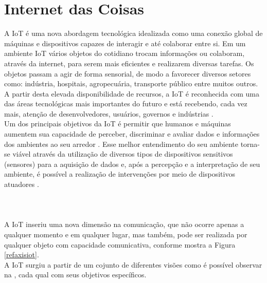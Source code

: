 \section{Internet das Coisas}%
\label{sec:internetofthings}
\quad
A \acrlong{IoT} é uma nova abordagem tecnológica idealizada como uma conexão global
de máquinas e dispositivos capazes de interagir e até colaborar entre si. Em um ambiente \acrshort{IoT} vários objetos do cotidiano trocam informações
ou colaboram, através da internet, para serem mais eficientes e realizarem diversas tarefas.
Os objetos passam a agir de forma sensorial, de modo a favorecer diversos setores como:
indústria, hospitais, agropecuária, transporte público entre muitos outros. A partir desta
elevada disponibilidade de recursos, a \acrshort{IoT} é reconhecida com uma das áreas tecnológicas mais importantes
do futuro e está recebendo, cada vez mais, atenção de desenvolvedores, usuários, governos e indústrias \cite{giusto}.
\\ \null
\quad
Um dos principais objetivos da \acrlong{IoT} é permitir
que humanos e máquinas aumentem sua capacidade de perceber, discriminar e avaliar dados e informações dos ambientes ao seu arredor \cite{IOTS}.
 Esse melhor entendimento do seu ambiente torna-se viável através da utilização
 de diversos tipos de dispositivos sensitivos (sensores) para a aquisição de dados e, após a percepção e a interpretação
 de seu ambiente, é possível a realização de intervenções por meio de dispositivos atuadores \cite{IOTV}. \\\\\\\\ \null
 \quad A \acrshort{IoT}
 inseriu uma nova dimensão na comunicação, que não ocorre apenas a qualquer momento e em qualquer lugar, mas também, pode ser realizada por qualquer objeto
 com capacidade comunicativa, conforme mostra a Figura \ref{refaxisiot}.
\\ \null
 \quad
 A \acrlong{IoT} surgiu a partir de um cojunto de diferentes visões como é possível observar na  , cada qual com seus objetivos específicos. %
 \pagebreak
